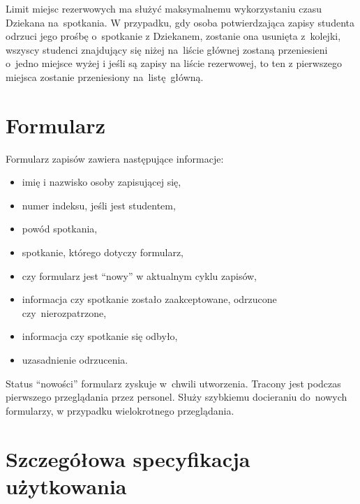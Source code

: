 \documentclass[licencjacka]{pracamgr}
\begin{document}
Limit miejsc rezerwowych ma służyć maksymalnemu wykorzystaniu czasu Dziekana na~spotkania. W przypadku, gdy osoba potwierdzająca zapisy studenta odrzuci jego prośbę o~spotkanie z Dziekanem, zostanie ona usunięta z~kolejki, wszyscy studenci znajdujący się niżej na~liście głównej zostaną przeniesieni o~jedno miejsce wyżej i jeśli są zapisy na liście rezerwowej, to ten z pierwszego miejsca zostanie przeniesiony na~listę~główną.


\section{Formularz}
Formularz zapisów zawiera następujące informacje:

\begin{itemize}
\setlength\itemsep{0,05em}
    \item imię i nazwisko osoby zapisującej się,
    \item numer indeksu, jeśli jest studentem,
    \item powód spotkania,
    \item spotkanie, którego dotyczy formularz,
    \item czy formularz jest “nowy” w aktualnym cyklu zapisów,
    \item informacja czy spotkanie zostało zaakceptowane, odrzucone czy~nierozpatrzone,
    \item informacja czy spotkanie się odbyło,
    \item uzasadnienie odrzucenia.
\end{itemize}
Status \enquote{nowości} formularz zyskuje w~chwili utworzenia. Tracony jest podczas pierwszego przeglądania przez personel. Służy szybkiemu docieraniu do~nowych formularzy, w przypadku wielokrotnego przeglądania.

\section{Szczegółowa specyfikacja użytkowania}
\end{document}
